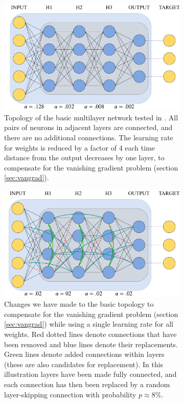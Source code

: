 \documentclass{article}
\begin{document}
\begin{figure}
  \centering
  \begin{subfigure}[t]{.48\textwidth}
    \includegraphics[width=.9\textwidth]{figures/basic_topology_illustration.pdf}
    \caption{Topology of the basic multilayer network tested in \cite{scellier17}. All pairs of neurons in adjacent layers are connected, and there are no additional connections. The learning rate for weights is reduced by a factor of 4 each time distance from the output decreases by one layer, to compensate for the vanishing gradient problem (section \ref{sec:vangrad}).}
    \label{fig:top_basic}
  \end{subfigure}
  \hfill
  \begin{subfigure}[t]{.48\textwidth}
    \includegraphics[width=.9\textwidth]{figures/topology_changes_illustration.pdf}
    \caption{Changes we have made to the basic topology to compensate for the vanishing gradient problem (section \ref{sec:vangrad}) while using a single learning rate for all weights. Red dotted lines denote connections that have been removed and blue lines denote their replacements. Green lines denote added connections within layers (these are also candidates for replacement). In this illustration layers have been made fully connected, and each connection has then been replaced by a random layer-skipping connection with probability $p\approx 8\%$.}
    \label{fig:top_sw}
  \end{subfigure}
  \caption{}
  \label{fig:topology_illus}
\end{figure}
\end{document}
